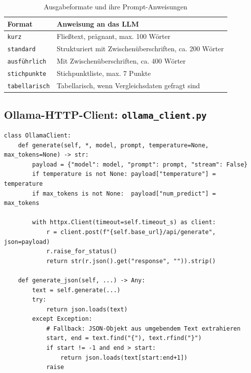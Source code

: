 \documentclass[12pt, a4paper]{article}
\begin{document}
\begin{table}[H]
\centering
\small
\begin{tabular}{lp{9cm}}
\toprule
\textbf{Format} & \textbf{Anweisung an das LLM} \\
\midrule
\texttt{kurz} & Fließtext, prägnant, max. 100 Wörter \\
\texttt{standard} & Strukturiert mit Zwischenüberschriften, ca. 200 Wörter \\
\texttt{ausführlich} & Mit Zwischenüberschriften, ca. 400 Wörter \\
\texttt{stichpunkte} & Stichpunktliste, max. 7 Punkte \\
\texttt{tabellarisch} & Tabellarisch, wenn Vergleichsdaten gefragt sind \\
\bottomrule
\end{tabular}
\caption{Ausgabeformate und ihre Prompt-Anweisungen}
\end{table}

\subsection{Ollama-HTTP-Client: \texttt{ollama\_client.py}}

\begin{lstlisting}[style=pythonstyle, caption={HTTP-Client fuer Ollama}]
class OllamaClient:
    def generate(self, *, model, prompt, temperature=None, max_tokens=None) -> str:
        payload = {"model": model, "prompt": prompt, "stream": False}
        if temperature is not None: payload["temperature"] = temperature
        if max_tokens is not None:  payload["num_predict"] = max_tokens

        with httpx.Client(timeout=self.timeout_s) as client:
            r = client.post(f"{self.base_url}/api/generate", json=payload)
            r.raise_for_status()
            return str(r.json().get("response", "")).strip()

    def generate_json(self, ...) -> Any:
        text = self.generate(...)
        try:
            return json.loads(text)
        except Exception:
            # Fallback: JSON-Objekt aus umgebendem Text extrahieren
            start, end = text.find("{"), text.rfind("}")
            if start != -1 and end > start:
                return json.loads(text[start:end+1])
            raise
\end{lstlisting}
\end{document}
